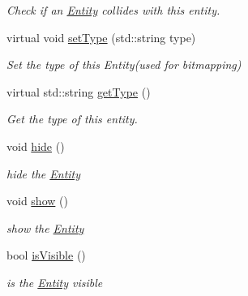 \begin{DoxyCompactItemize}
\begin{DoxyCompactList}\small\item\em Check if an \hyperlink{classty_lib_1_1_entity}{Entity} collides with this entity. \end{DoxyCompactList}\item 
\hypertarget{classty_lib_1_1_entity_a501afcddffc3359a51491377dea89e4d}{}virtual void \hyperlink{classty_lib_1_1_entity_a501afcddffc3359a51491377dea89e4d}{set\+Type} (std\+::string type)\label{classty_lib_1_1_entity_a501afcddffc3359a51491377dea89e4d}

\begin{DoxyCompactList}\small\item\em Set the type of this Entity(used for bitmapping) \end{DoxyCompactList}\item 
\hypertarget{classty_lib_1_1_entity_ada25552ccf50363a3b846ca718df9036}{}virtual std\+::string \hyperlink{classty_lib_1_1_entity_ada25552ccf50363a3b846ca718df9036}{get\+Type} ()\label{classty_lib_1_1_entity_ada25552ccf50363a3b846ca718df9036}

\begin{DoxyCompactList}\small\item\em Get the type of this entity. \end{DoxyCompactList}\item 
\hypertarget{classty_lib_1_1_entity_a1766118325f9c7e96ab702d3fe2af587}{}void \hyperlink{classty_lib_1_1_entity_a1766118325f9c7e96ab702d3fe2af587}{hide} ()\label{classty_lib_1_1_entity_a1766118325f9c7e96ab702d3fe2af587}

\begin{DoxyCompactList}\small\item\em hide the \hyperlink{classty_lib_1_1_entity}{Entity} \end{DoxyCompactList}\item 
\hypertarget{classty_lib_1_1_entity_a1dc8ab6172d82be5cf24cab0e637d3d5}{}void \hyperlink{classty_lib_1_1_entity_a1dc8ab6172d82be5cf24cab0e637d3d5}{show} ()\label{classty_lib_1_1_entity_a1dc8ab6172d82be5cf24cab0e637d3d5}

\begin{DoxyCompactList}\small\item\em show the \hyperlink{classty_lib_1_1_entity}{Entity} \end{DoxyCompactList}\item 
\hypertarget{classty_lib_1_1_entity_ab6ad91ab4b400ef84c2382365124d627}{}bool \hyperlink{classty_lib_1_1_entity_ab6ad91ab4b400ef84c2382365124d627}{is\+Visible} ()\label{classty_lib_1_1_entity_ab6ad91ab4b400ef84c2382365124d627}

\begin{DoxyCompactList}\small\item\em is the \hyperlink{classty_lib_1_1_entity}{Entity} visible \end{DoxyCompactList}\end{DoxyCompactItemize}
